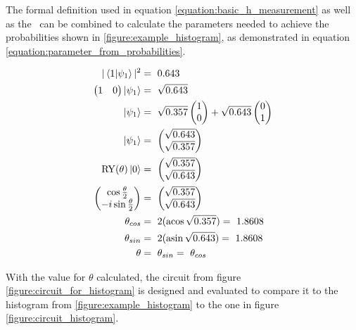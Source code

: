 The formal definition used in equation \ref{equation:basic_h_measurement} as well as the \rygate\ can be combined to calculate the parameters needed to achieve the probabilities shown in \ref{figure:example_histogram}, as demonstrated in equation \ref{equation:parameter_from_probabilities}. 

\begin{equation}
    \centering
    \begin{split}
        |\bra{1}\ket{\psi_1}|^2 &=\ 0.643 \\
        \begin{pmatrix}1 & 0\end{pmatrix}\ket{\psi_1} &=\ \sqrt{0.643} \\
        \ket{\psi_1} &=\ \sqrt{0.357}\begin{pmatrix} 1 \\ 0\end{pmatrix} + \sqrt{0.643}\begin{pmatrix} 0 \\ 1\end{pmatrix}\\
        \ket{\psi_1} &=\ \begin{pmatrix}\sqrt{0.643}\\ \sqrt{0.357}\end{pmatrix}\\
        \mathrm{RY}(\theta)\ket{0} &=\ \begin{pmatrix}\sqrt{0.357}\\ \sqrt{0.643}\end{pmatrix} \\
        \begin{pmatrix}\cos{\frac{\theta}{2}} \\ -i\sin{\frac{\theta}{2}}\end{pmatrix} &=\ \begin{pmatrix}\sqrt{0.357}\\ \sqrt{0.643}\end{pmatrix}\\
        \theta_{cos} &=\ 2(\acos{\sqrt{0.357}}) =\ 1.8608\\
        \theta_{sin} &=\ 2(\asin{\sqrt{0.643}}) =\ 1.8608\\
        \theta &=\ \theta_{sin} =\ \theta_{cos}\\
    \end{split}
    \label{equation:parameter_from_probabilities}
\end{equation}

With the value for $\theta$ calculated, the circuit from figure \ref{figure:circuit_for_histogram} is designed and evaluated to compare it to the histogram from \ref{figure:example_histogram} to the one in figure \ref{figure:circuit_histogram}.

